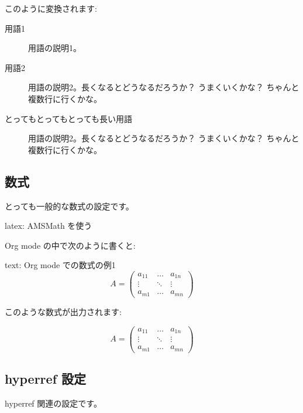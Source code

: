 \documentclass[dvipdfmx,a4j,14pt,uplatex]{jsarticle}
\begin{document}
このように変換されます:


\begin{description}
\item[{用語1}] 用語の説明1。
\item[{用語2}] 用語の説明2。長くなるとどうなるだろうか？ 
うまくいくかな？
ちゃんと複数行に行くかな。
\item[{とってもとってもとっても長い用語}] 用語の説明2。長くなるとどうなるだろうか？ 
うまくいくかな？
ちゃんと複数行に行くかな。
\end{description}

\subsection{数式}
\label{sec:org1065506}
とっても一般的な数式の設定です。

\begin{programlist}[label={org0f8b937}]{latex}{: AMSMath を使う}\usepackage{amsmath,amssymb}
\usepackage{bm}
\end{programlist}

Org mode の中で次のように書くと:

\begin{programlist}[label={org4f5b2f1}]{text}{: Org mode での数式の例1}\begin{equation}
  A = \begin{pmatrix}
        a_{11} & \ldots & a_{1n} \\
        \vdots & \ddots & \vdots \\
        a_{m1} & \ldots & a_{mn}
      \end{pmatrix}
\end{equation}
\end{programlist}

このような数式が出力されます:

\begin{equation}
  A = \begin{pmatrix}
        a_{11} & \ldots & a_{1n} \\
        \vdots & \ddots & \vdots \\
        a_{m1} & \ldots & a_{mn}
      \end{pmatrix}
\end{equation}

\subsection{hyperref 設定}
\label{sec:orgac3aa77}
hyperref 関連の設定です。
\end{document}
